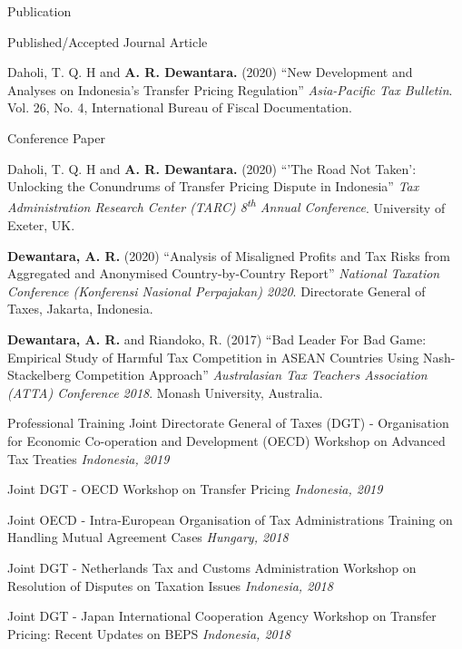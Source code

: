 \documentclass{resume}
\begin{document}
\begin{rSection}{Publication}
\begin{rSubsection}{Published/Accepted Journal Article}{}{}{}
 \item Daholi, T. Q. H and \textbf{A. R. Dewantara.} (2020) “New Development and Analyses on Indonesia’s Transfer Pricing Regulation” \textit{Asia-Pacific Tax Bulletin}. Vol. 26, No. 4, International Bureau of Fiscal Documentation.
\end{rSubsection}
\begin{rSubsection}{Conference Paper}{}{}{}
\item Daholi, T. Q. H and \textbf{A. R. Dewantara.} (2020) “’The Road Not Taken’: Unlocking the Conundrums of Transfer Pricing Dispute in Indonesia” \textit{Tax Administration Research Center (TARC) 8\textsuperscript{th} Annual Conference}. University of Exeter, UK.
\item \textbf{Dewantara, A. R.} (2020) “Analysis of Misaligned Profits and Tax Risks from Aggregated and Anonymised Country-by-Country Report” \textit{National Taxation Conference (Konferensi Nasional Perpajakan) 2020}. Directorate General of Taxes, Jakarta, Indonesia.
\item \textbf{Dewantara, A. R.} and Riandoko, R. (2017) “Bad Leader For Bad Game: Empirical Study of Harmful Tax Competition in ASEAN Countries Using Nash-Stackelberg Competition Approach” \textit{Australasian Tax Teachers Association (ATTA) Conference 2018}. Monash University, Australia.
\end{rSubsection}
\end{rSection}
\newpage
\begin{rSection}{Professional Training}
{Joint Directorate General of Taxes (DGT) - Organisation for Economic Co-operation and Development (OECD) Workshop on Advanced Tax Treaties} \hfill {\em Indonesia, 2019} 

{Joint DGT - OECD Workshop on Transfer Pricing} \hfill {\em Indonesia, 2019} 

{Joint OECD - Intra-European Organisation of Tax Administrations Training on Handling Mutual Agreement Cases} \hfill {\em Hungary, 2018}

{Joint DGT - Netherlands Tax and Customs Administration Workshop on Resolution of Disputes on Taxation Issues} \hfill {\em Indonesia, 2018}

{Joint DGT - Japan International Cooperation Agency Workshop on Transfer Pricing: Recent Updates on BEPS} \hfill {\em Indonesia, 2018}
\end{rSection}
\end{document}
